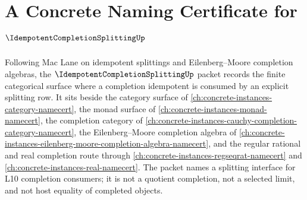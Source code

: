 \chapter{A Concrete Naming Certificate for $\IdempotentCompletionSplittingUp$}
\label{ch:concrete-instances-idempotent-completion-splitting-namecert}

Following Mac Lane on idempotent splittings and Eilenberg--Moore completion algebras, the $\IdempotentCompletionSplittingUp$ packet records the finite categorical surface where a completion idempotent is consumed by an explicit splitting row. It sits beside the category surface of \autoref{ch:concrete-instances-category-namecert}, the monad surface of \autoref{ch:concrete-instances-monad-namecert}, the completion category of \autoref{ch:concrete-instances-cauchy-completion-category-namecert}, the Eilenberg--Moore completion algebra of \autoref{ch:concrete-instances-eilenberg-moore-completion-algebra-namecert}, and the regular rational and real completion route through \autoref{ch:concrete-instances-regseqrat-namecert} and \autoref{ch:concrete-instances-real-namecert}. The packet names a splitting interface for L10 completion consumers; it is not a quotient completion, not a selected limit, and not host equality of completed objects.

